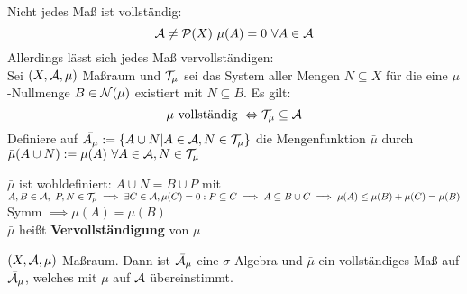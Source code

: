   \begin{remark}
    Nicht jedes Maß ist vollständig:
    \[
      \script{A} \neq \script{P}(X) \ \mu(A) = 0 \ \forall A \in \script{A}
    \]
    Allerdings lässt sich jedes Maß vervollständigen:\\
    Sei $(X, \mathcal{A}, \mu)$ Maßraum und $\mathcal{T}_{\mu}$ sei das System aller Mengen $N \subseteq X$ für die eine $\mu$-Nullmenge $B \in \mathcal{N}(\mu)$ existiert mit $N \subseteq B$. Es gilt:\\
    \[
      \mu \text{ vollständig } \Leftrightarrow \mathcal{T}_{\mu} \subseteq \mathcal{A}
    \]
    Definiere auf $\bar{A_{\mu}} := \{A \cup N | A \in \mathcal{A}, N \in \mathcal{T}_{\mu}\}$ die Mengenfunktion $\bar{\mu}$ durch $\bar{\mu}(A\cup N) := \mu(A) \ \forall A \in \mathcal{A}, N\in \mathcal{T}_{\mu}$
  \end{remark}

  \begin{remark}
    $\bar{\mu}$ ist wohldefiniert: $A \cup N = B \cup P$ mit $A,B\in \mathcal{A}, \ P,N \in \mathcal{T}_{\mu} \implies \exists C \in \mathcal{A}, \mu(C) = 0: P \subseteq C \implies A \subseteq B \cup C \implies \mu(A) \leq \mu(B) + \mu(C) = \mu(B)$\\
    Symm $\implies \mu(A) = \mu(B)$\\
    $\bar{\mu}$ heißt \textbf{Vervollständigung} von $\mu$
  \end{remark}

  \begin{theorem}
    $(X,\mathcal{A}, \mu)$ Maßraum. Dann ist $\bar{\mathcal{A}}_{\mu}$ eine $\sigma$-Algebra und $\bar{\mu}$ ein vollständiges Maß auf $\bar{\mathcal{A}}_{\mu}$, welches mit $\mu$ auf $\mathcal{A}$ übereinstimmt.
  \end{theorem}

